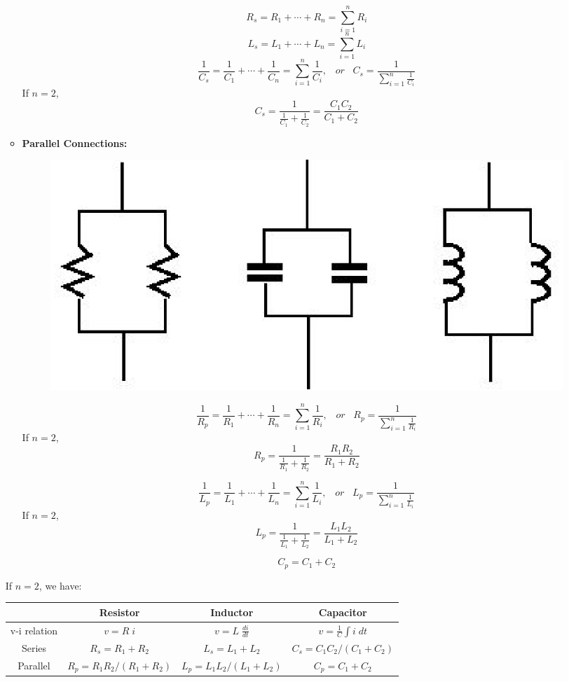 \documentclass[12pt]{article}
\begin{document}
\begin{itemize}
\begin{itemize}
    \[  R_{s}=R_1+\cdots+R_n=\sum_{i=1}^n R_i \]
    \[  L_{s}=L_1+\cdots+L_n=\sum_{i=1}^n L_i \]
    \[  \frac{1}{C_{s}}=\frac{1}{C_1}+\cdots+\frac{1}{C_n}
    =\sum_{i=1}^n \frac{1}{C_i},\;\;\;or\;\;\;
    C_{s}=\frac{1}{\sum_{i=1}^n \frac{1}{C_i}} \]
    If $n=2$,
    \[ C_s=\frac{1}{\frac{1}{C_1}+\frac{1}{C_2}}=\frac{C_1C_2}{C_1+C_2} \]

  \item {\bf Parallel Connections:}

    \begin{figure}
      \includegraphics[scale=0.5]{figures/parallel_connections.eps}
    \end{figure}
    \[  \frac{1}{R_{p}}=\frac{1}{R_1}+\cdots+\frac{1}{R_n}
    =\sum_{i=1}^n \frac{1}{R_i},\;\;\;or\;\;\;
    R_{p}=\frac{1}{\sum_{i=1}^n \frac{1}{R_i}} \]
    If $n=2$,
    \[ R_p=\frac{1}{\frac{1}{R_1}+\frac{1}{R_2}}=\frac{R_1R_2}{R_1+R_2} \]
      
    \[  \frac{1}{L_{p}}=\frac{1}{L_1}+\cdots+\frac{1}{L_n}
    =\sum_{i=1}^n \frac{1}{L_i},\;\;\;or\;\;\;
    L_{p}=\frac{1}{\sum_{i=1}^n \frac{1}{L_i}} \]
    If $n=2$,
    \[ L_p=\frac{1}{\frac{1}{L_1}+\frac{1}{L_2}}=\frac{L_1L_2}{L_1+L_2} \]

    \[ C_{p}=C_1+C_2 \]
  \end{itemize}
  If $n=2$, we have:

  \begin{tabular}{c||c|c|c}\hline
    & \mbox{Resistor} & \mbox{Inductor} & \mbox{Capacitor} \\ \hline \hline
    v-i relation  & $v=R\;i$ & $v=L \;\frac{di}{dt}$  & $v=\frac{1}{C}\int i\;dt $ \\ \hline
    \mbox{Series}   & $R_s=R_1+R_2$ & $L_s=L_1+L_2$ & $C_s=C_1C_2/(C_1+C_2)$ \\ \hline
    \mbox{Parallel} & $R_p=R_1R_2/(R_1+R_2)$ & $L_p=L_1L_2/(L_1+L_2)$ & $C_p=C_1+C_2$ \\ \hline
  \end{tabular}


\end{itemize}
\end{document}
